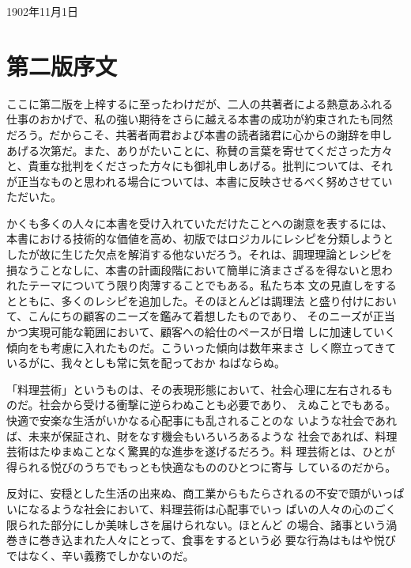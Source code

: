 1902年11月1日

\newpage

\hypertarget{ux7b2cux4e8cux7248ux5e8fux6587}{%
\section{第二版序文}\label{ux7b2cux4e8cux7248ux5e8fux6587}}

\normalsize
{}
\vspace*{1\zw}

ここに第二版を上梓するに至ったわけだが、二人の共著者による熱意あふれる
仕事のおかげで、私の強い期待をさらに越える本書の成功が約束されたも同然
だろう。だからこそ、共著者両君および本書の読者諸君に心からの謝辞を申し
あげる次第だ。また、ありがたいことに、称賛の言葉を寄せてくださった方々
と、貴重な批判をくださった方々にも御礼申しあげる。批判については、それ
が正当なものと思われる場合については、本書に反映させるべく努めさせてい
ただいた。

かくも多くの人々に本書を受け入れていただけたことへの謝意を表するには、
本書における技術的な価値を高め、初版ではロジカルにレシピを分類しようと
したが故に生じた欠点を解消する他ないだろう。それは、調理理論とレシピを
損なうことなしに、本書の計画段階において簡単に済まさざるを得ないと思わ
れたテーマについてう限り肉薄することでもある。私たち本
文の見直しをするとともに、多くのレシピを追加した。そのほとんどは調理法
と盛り付けにおいて、こんにちの顧客のニーズを鑑みて着想したものであり、
そのニーズが正当かつ実現可能な範囲において、顧客への給仕のペースが日増
しに加速していく傾向をも考慮に入れたものだ。こういった傾向は数年来まさ
しく際立ってきているがに、我々としも常に気を配っておか
ねばならぬ。

「料理芸術」というものは、その表現形態において、社会心理に左右されるも
のだ。社会から受ける衝撃に逆らわぬことも必要であり、
えぬことでもある。快適で安楽な生活がいかなる心配事にも乱されることのな
いような社会であれば、未来が保証され、財をなす機会もいろいろあるような
社会であれば、料理芸術はたゆまぬことなく驚異的な進歩を遂げるだろう。料
理芸術とは、ひとが得られる悦びのうちでもっとも快適なもののひとつに寄与
しているのだから。

反対に、安穏とした生活の出来ぬ、商工業からもたらされるの不安で頭がいっぱいになるような社会において、料理芸術は心配事でいっ
ぱいの人々の心のごく限られた部分にしか美味しさを届けられない。ほとんど
の場合、諸事という渦巻きに巻き込まれた人々にとって、食事をするという必
要な行為はもはや悦びではなく、辛い義務でしかないのだ。


